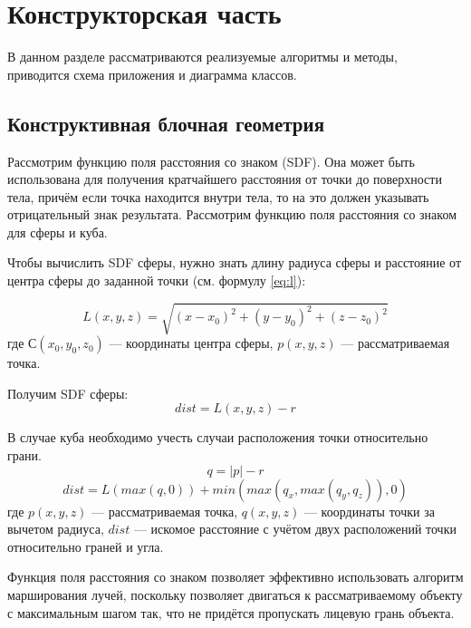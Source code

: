 \section{Конструкторская часть}

В  данном  разделе  рассматриваются  реализуемые  алгоритмы  и  методы, приводится схема приложения и диаграмма классов.

\subsection{Конструктивная блочная геометрия}

Рассмотрим функцию поля расстояния со знаком (SDF).
Она может быть  использована  для  получения кратчайшего  расстояния  от  точки  до поверхности тела, причём если точка находится внутри тела, то на это должен 
указывать  отрицательный  знак  результата.
Рассмотрим  функцию  поля расстояния со знаком для сферы и куба.

Чтобы  вычислить  SDF  сферы,  нужно  знать  длину  радиуса  сферы  и 
расстояние от центра сферы до заданной точки (см. формулу \ref{eq:l}): 

\begin{equation}
	L(x, y, z) = \sqrt{(x - x_0)^2 + (y - y_0)^2 + (z - z_0)^2}
	\label{eq:l}
\end{equation}
где $С(x_0, y_0, z_0)$ --- координаты центра сферы, $p(x, y, z)$ --- рассматриваемая точка.

Получим SDF сферы:
\begin{equation}
	dist = L(x, y, z) - r
	\label{eq:sdf_sphere}
\end{equation}

В случае куба необходимо учесть случаи расположения точки относительно грани.
\begin{equation}
	q = \left| p \right| - r
	\label{eq:q}
\end{equation}
\begin{equation}
	dist = L(max(q, 0)) + min(max(q_x, max(q_y, q_z)), 0)
	\label{eq:q}
\end{equation}
где $p(x, y, z)$ --- рассматриваемая точка, $q(x, y, z)$ --- координаты точки за вычетом радиуса, $dist$ --- искомое расстояние с учётом двух расположений точки относительно граней и угла.

Функция поля расстояния со знаком позволяет эффективно использовать алгоритм  марширования  лучей,  поскольку  позволяет  двигаться  к рассматриваемому  объекту  с  максимальным  шагом  так,  что  не  придётся 
пропускать лицевую грань объекта.

